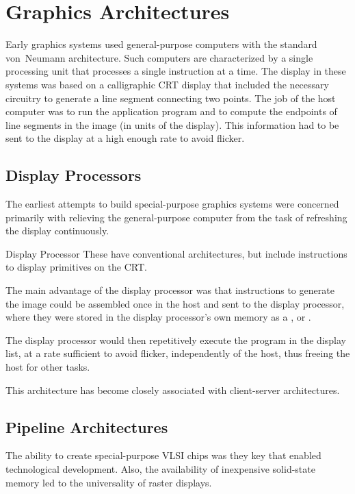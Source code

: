 \documentclass[\main/notes.tex]{subfiles}
\begin{document}
		\section{Graphics Architectures}
			Early graphics systems used general-purpose computers
			with the standard von~Neumann architecture.
			Such computers are characterized by a single processing unit
			that processes a single instruction at a time.
			The display in these systems was based on a calligraphic CRT display
			that included the necessary circuitry to generate a line segment
			connecting two points.
			The job of the host computer was to run the application program
			and to compute the endpoints of line segments in the image
			(in units of the display).
			This information had to be sent to the display at a high enough rate
			to avoid flicker.

			\subsection{Display Processors}
				The earliest attempts to build special-purpose graphics systems
				were concerned primarily with relieving the general-purpose computer
				from the task of refreshing the display continuously.

				\begin{definition}{Display Processor}
					These have conventional architectures,
					but include instructions to display primitives on the CRT.

					The main advantage of the display processor
					was that instructions to generate the image
					could be assembled once in the host and sent to the display processor,
					where they were stored in the display processor's own memory
					as a , or .

					The display processor would then
					repetitively execute the program in the display list,
					at a rate sufficient to avoid flicker,
					independently of the host,
					thus freeing the host for other tasks.
				\end{definition}

				This architecture has become closely associated with
				client-server architectures.

			\subsection{Pipeline Architectures}
				The ability to create special-purpose VLSI chips
				was they key that enabled technological development.
				Also, the availability of inexpensive solid-state memory
				led to the universality of raster displays.
\end{document}
